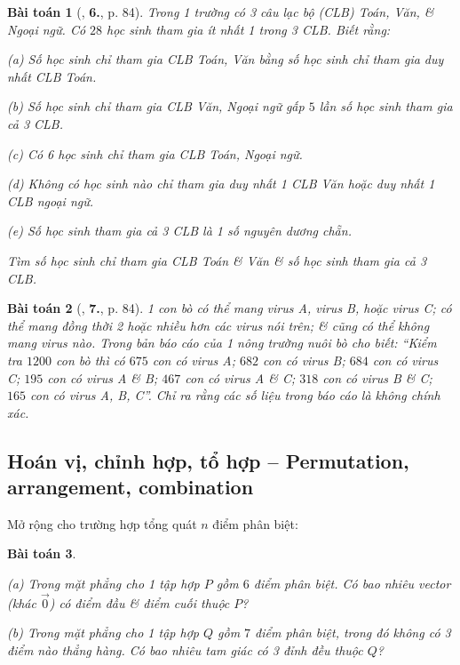 \documentclass{article}
\numberwithin{equation}{section}
\newtheorem{baitoan}{Bài toán}[section]
\begin{document}
\begin{baitoan}[\cite{TL_chuyen_Toan_Dai_So_Giai_Tich_11}, \textbf{6.}, p. 84]
	Trong 1 trường có 3 câu lạc bộ (CLB) Toán, Văn, \& Ngoại ngữ. Có $28$ học sinh tham gia ít nhất 1 trong 3 CLB. Biết rằng:
	\begin{enumerate*}
		\item[(a)] Số học sinh chỉ tham gia CLB Toán, Văn bằng số học sinh chỉ tham gia duy nhất CLB Toán.
		\item[(b)] Số học sinh chỉ tham gia CLB Văn, Ngoại ngữ gấp $5$ lần số học sinh tham gia cả 3 CLB.
		\item[(c)] Có 6 học sinh chỉ tham gia CLB Toán, Ngoại ngữ.
		\item[(d)] Không có học sinh nào chỉ tham gia duy nhất 1 CLB Văn hoặc duy nhất 1 CLB ngoại ngữ.
		\item[(e)] Số học sinh tham gia cả 3 CLB là 1 số nguyên dương chẵn.
	\end{enumerate*}
	Tìm số học sinh chỉ tham gia CLB Toán \& Văn \& số học sinh tham gia cả 3 CLB.
\end{baitoan}

\begin{baitoan}[\cite{TL_chuyen_Toan_Dai_So_Giai_Tich_11}, \textbf{7.}, p. 84]
	1 con bò có thể mang virus A, virus B, hoặc virus C; có thể mang đồng thời 2 hoặc nhiều hơn các virus nói trên; \& cũng có thể không mang virus nào. Trong bản báo cáo của 1 nông trường nuôi bò cho biết: ``Kiểm tra $1200$ con bò thì có $675$ con có virus A; $682$ con có virus B; $684$ con có virus C; $195$ con có virus A \& B; $467$ con có virus A \& C; $318$ con có virus B \& C; $165$ con có virus A, B, C''. Chỉ ra rằng các số liệu trong báo cáo là không chính xác.
\end{baitoan}


\subsection{Hoán vị, chỉnh hợp, tổ hợp -- Permutation, arrangement, combination}
Mở rộng \cite[Ví dụ 1, p. 87]{TL_chuyen_Toan_Dai_So_Giai_Tich_11} cho trường hợp tổng quát $n$ điểm phân biệt:
 
\begin{baitoan}
	\begin{enumerate*}
		\item[(a)] Trong mặt phẳng cho 1 tập hợp $P$ gồm $6$ điểm phân biệt. Có bao nhiêu vector (khác $\vec{0}$) có điểm đầu \& điểm cuối thuộc $P$?
		\item[(b)] Trong mặt phẳng cho 1 tập hợp $Q$ gồm $7$ điểm phân biệt, trong đó không có 3 điểm nào thẳng hàng. Có bao nhiêu tam giác có 3 đỉnh đều thuộc $Q$?
	\end{enumerate*}
\end{baitoan}
\end{document}
